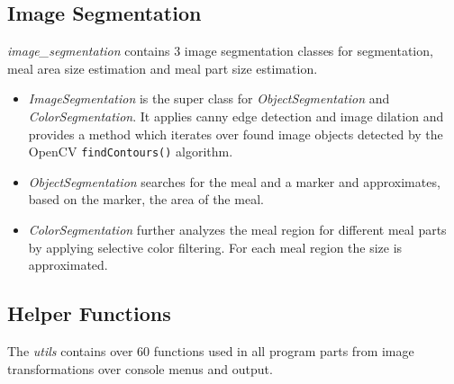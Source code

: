	\subsection{Image Segmentation}
	\textit{image\_segmentation} contains 3 image segmentation classes for segmentation, meal area size estimation and meal part size estimation.
	\begin{itemize}
		\item\textit{ImageSegmentation} is the super class for \textit{ObjectSegmentation} and \textit{ColorSegmentation}. It applies canny edge detection and image dilation and provides a method which iterates over found image objects detected by the OpenCV \verb|findContours()| algorithm.
		\item\textit{ObjectSegmentation} searches for the meal and a marker and approximates, based on the marker, the area of the meal.
		\item\textit{ColorSegmentation} further analyzes the meal region for different meal parts by applying selective color filtering. For each meal region the size is approximated.
	\end{itemize}
	
	\subsection{Helper Functions}
	The \textit{utils} contains over 60 functions used in all program parts from image transformations over console menus and output.


